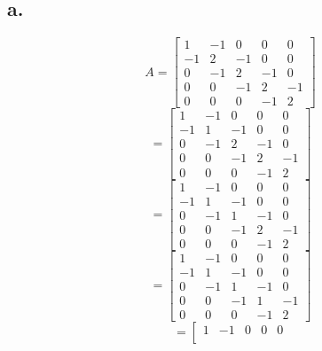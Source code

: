\documentclass[twocolumn]{article}
\newenvironment{SChinese}{%
	\CJKfamily{gbsn}%
	\CJKtilde
	\CJKnospace}{}
\begin{document}
\begin{CJK}{UTF8}{}
\begin{SChinese}
			\subsection*{a.}
				\begin{displaymath}
					A = \left [\begin{matrix}
					1 & -1 & 0 & 0 & 0 \\
					-1 & 2 & -1 & 0 & 0 \\
					0 & -1 & 2 & -1 & 0 \\
					0 & 0 & -1 & 2 & -1 \\
					0 & 0 & 0 & -1 & 2
					\end{matrix}\right] 
					\end{displaymath}
					\begin{displaymath} 
					= \left [\begin{matrix}
					1 & -1 & 0 & 0 & 0 \\
					-1 & 1 & -1 & 0 & 0 \\
					0 & -1 & 2 & -1 & 0 \\
					0 & 0 & -1 & 2 & -1 \\
					0 & 0 & 0 & -1 & 2
					\end{matrix}\right]
					\end{displaymath}
					\begin{displaymath}
					= \left [\begin{matrix}
					1 & -1 & 0 & 0 & 0 \\
					-1 & 1 & -1 & 0 & 0 \\
					0 & -1 & 1 & -1 & 0 \\
					0 & 0 & -1 & 2 & -1 \\
					0 & 0 & 0 & -1 & 2
					\end{matrix}\right] 
					\end{displaymath}
					\begin{displaymath}
					= \left [\begin{matrix}
					1 & -1 & 0 & 0 & 0 \\
					-1 & 1 & -1 & 0 & 0 \\
					0 & -1 & 1 & -1 & 0 \\
					0 & 0 & -1 & 1 & -1 \\
					0 & 0 & 0 & -1 & 2
					\end{matrix}\right]
					\end{displaymath}
					\begin{displaymath}
					= \left [\begin{matrix}
					1 & -1 & 0 & 0 & 0 \\

\end{matrix}
\end{displaymath}
\end{SChinese}
\end{CJK}
\end{document}
